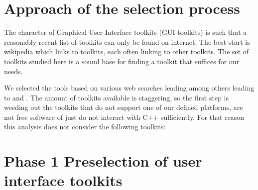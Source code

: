 \section{Approach of the selection process}

The character of Graphical User Interface toolkits (GUI toolkits) is such that
a reasonably recent list of toolkits can only be found on internet. The best
start is wikipedia which links to toolkits, each often linking to other
toolkits. The set of toolkits studied here is a sound base for finding a
toolkit that suffices for our needs.

We selected the tools based on various web searches leading among others
leading to \cite{wiki:xplatf} and \cite{wiki:xplatf_gui}.  The amount of
toolkits available is staggering, so the first step is weeding out the toolkits
that do not support one of our defined platforms, are not free software of just
do not interact with C++ sufficiently.  For that reason this analysis does not
consider the following toolkits:

\section{Phase 1 Preselection of user interface toolkits}

